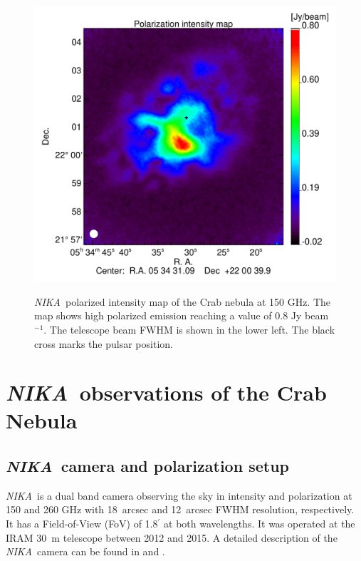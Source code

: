 \documentclass[twocolumn,traditabstract]{aa}
\def\NIKA{\textit{NIKA}}
\begin{document}
 \begin{figure}
  \centering
      {\includegraphics[width=0.75\linewidth,keepaspectratio]{figures/Crab_ipol2_2mm.pdf}}
\caption{\NIKA\ polarized intensity map of the  Crab nebula at 150 GHz. The map shows high polarized emission reaching a value of 0.8 Jy beam$^{-1}$. The telescope beam FWHM is shown in the lower left. The black cross marks the pulsar position.}
\label{crab_ipol_maps}		
  \end{figure}
 

\section{\NIKA\ observations of the Crab Nebula}\label{sec:NIKA observations}
\subsection{\NIKA\ camera and polarization setup}\label{sec:nika camera}
\NIKA\ is a dual band camera observing the sky in intensity and polarization at
150 and 260 GHz with 18~arcsec and 12~arcsec FWHM resolution, respectively. It
has a Field-of-View (FoV) of 1.8$^{\prime}$ at both wavelengths. It was operated at the
IRAM 30~m telescope between 2012 and 2015. A detailed description of the
\NIKA\ camera can be found in \citet{monfardini2010, monfardini2011} and
\citet{catalano2014}.
\end{document}
